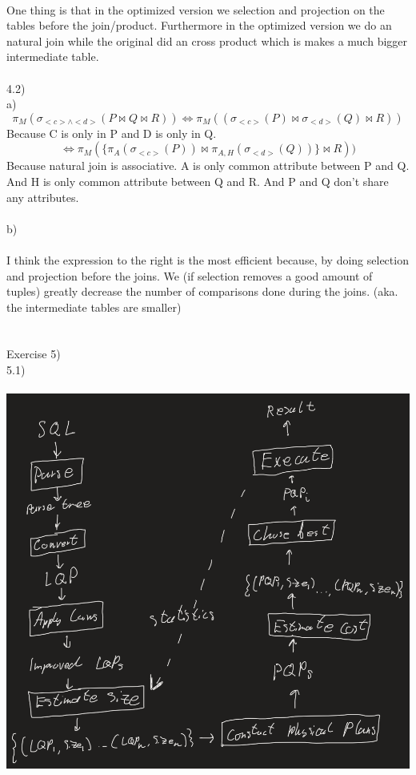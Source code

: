 \documentclass[12pt, letterpaper, twoside]{article}
\begin{document}
\\
One thing is that in the optimized version we selection and projection on the tables before the join/product. Furthermore in the optimized version we do an natural join while the original did an cross product which is makes a much bigger intermediate table.\\
\\
4.2)\\
a)
$$
\pi_M(\sigma_{<c> \wedge <d>}(P \bowtie Q \bowtie R))
\iff
\pi_M((\sigma_{<c>}(P) \bowtie \sigma_{<d>}(Q) \bowtie R))
$$
Because C is only in P and D is only in Q.
$$
\iff 
\pi_M(\{\pi_A(\sigma_{<c>}(P)) \bowtie \pi_{A,H}(\sigma_{<d>}(Q))\} \bowtie R))
$$
Because natural join is associative. A is only common attribute between P and Q. And H is only common attribute between Q and R. And P and Q don't share any attributes.\\
\\
b)\\
\\
I think the expression to the right is the most efficient because, by doing selection and projection before the joins. We (if selection removes a good amount of tuples) greatly decrease the number of comparisons done during the joins. (aka. the intermediate tables are smaller)\\
\\
\newpage
\ \\
Exercise 5)\\
5.1)\\
\\
\includegraphics[scale=0.5]{"5_1.png"}\\
\end{document}
